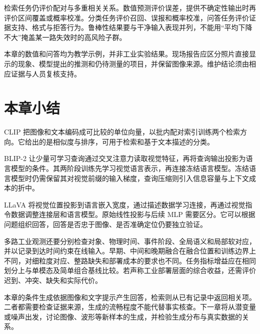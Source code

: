 检索任务仍评价配对与多重相关关系。数值预测评价误差，提供不确定性输出时再评价区间覆盖或概率校准。分类任务评价召回、误报和概率校准，问答任务评价证据支持、格式与拒答行为。鲁棒性结果要与干净输入表现并列，不能用“平均下降不大”掩盖某一路失效时的高风险子群。

本章的数值和问答均为教学示例，并非工业实验结果。现场报告应区分照片直接显示的现象、模型提出的推测和仍待测量的项目，并保留图像来源。维护结论须由相应证据与人员复核支持。

\Needspace{.70\textheight}
\section*{本章小结}
CLIP 把图像和文本编码成可比较的单位向量，以批内配对索引训练两个检索方向。它给出的是相似度与排序，可用于检索和基于文本描述的分类。

BLIP-2 让少量可学习查询通过交叉注意力读取视觉特征，再将查询输出投影为语言模型的条件。其两阶段训练先学习视觉语言表示，再连接冻结语言模型。冻结语言模型时仍需保留其对视觉前缀的输入梯度，查询压缩则引入信息容量与上下文成本的折中。

LLaVA 将视觉位置投影到语言嵌入宽度，通过描述数据学习连接，再通过视觉指令数据调整连接层和语言模型。原始线性投影与后续 MLP 需要区分。它可以根据问题组织回答，回答是否忠于图像、是否准确定位仍要独立验证。

多路工业观测还要分别检查对象、物理时间、事件阶段、全局语义和局部软对应，并以记录到达时间约束在线输入。早期、中间和晚期融合在融合位置和训练边界上不同，对细粒度对应、整路缺失和部署成本的要求也不同。任务指标增益应在相同划分上与单模态及简单组合基线比较。若声称工业部署层面的综合收益，还需评价迟到、冲突、缺失和实际代价。

本章的条件生成依据图像和文字提示产生回答，检索则从已有记录中返回相关项。二者都需要检查证据来源，生成的流畅程度不能代替事实核查。下一章将从潜变量或噪声出发，讨论图像、波形等新样本的生成，并检验生成分布与真实数据的关系。

\clearpage
